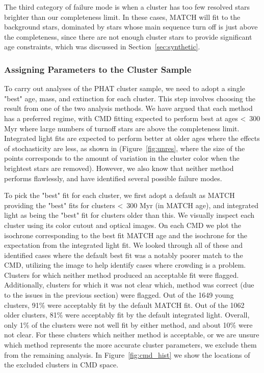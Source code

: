 \documentclass{emulateapj}
\begin{document}
The third category of failure mode is when a cluster has too few resolved stars brighter than our completeness limit.  In these cases, MATCH will fit to the background stars, dominated by stars whose main sequence turn off is just above the completeness, since there are not enough cluster stars to provide significant age constraints, which was discussed in Section~\ref{sec:synthetic}.



\subsubsection{Assigning Parameters to the Cluster Sample}\label{sec:assign}

To carry out analyses of the PHAT cluster sample, we need to adopt a single "best" age, mass, and extinction for each cluster.  This step involves choosing the result from one of the two analysis methods.  We have argued that each method has a preferred regime, with CMD fitting expected to perform best at ages \textless\ 300 Myr where large numbers of turnoff stars are above the completeness limit.  Integrated light fits are expected to perform better at older ages where the effects of stochasticity are less, as shown in (Figure~\ref{fig:unres}, where the size of the points corresponds to the amount of variation in the cluster color when the brightest stars are removed).  However, we also know that neither method performs flawlessly, and have identified several possible failure modes.  

To pick the "best" fit for each cluster, we first adopt a default as MATCH providing the "best" fits for clusters \textless\ 300 Myr (in MATCH age), and integrated light as being the "best" fit for clusters older than this.  We visually inspect each cluster using its color cutout and optical images.  On each CMD we plot the isochrone corresponding to the best fit MATCH age and the isochrone for the expectation from the integrated light fit.  We looked through all of these and identified cases where the default best fit was a notably poorer match to the CMD, utilizing the image to help identify cases where crowding is a problem.  Clusters for which neither method produced an acceptable fit were flagged.  Additionally, clusters for which it was not clear which, method was correct (due to the issues in the previous section) were flagged.  Out of the 1649 young clusters, 91\% were acceptably fit by the default MATCH fit.  Out of the 1062 older clusters, 81\% were acceptably fit by the default integrated light.  Overall, only 1\% of the clusters were not well fit by either method, and about 10\% were not clear.  For these clusters which neither method is acceptable, or we are unsure which method represents the more accurate cluster parameters, we exclude them from the remaining analysis.  In Figure~\ref{fig:cmd_hist} we show the locations of the excluded clusters in CMD space.
\end{document}
